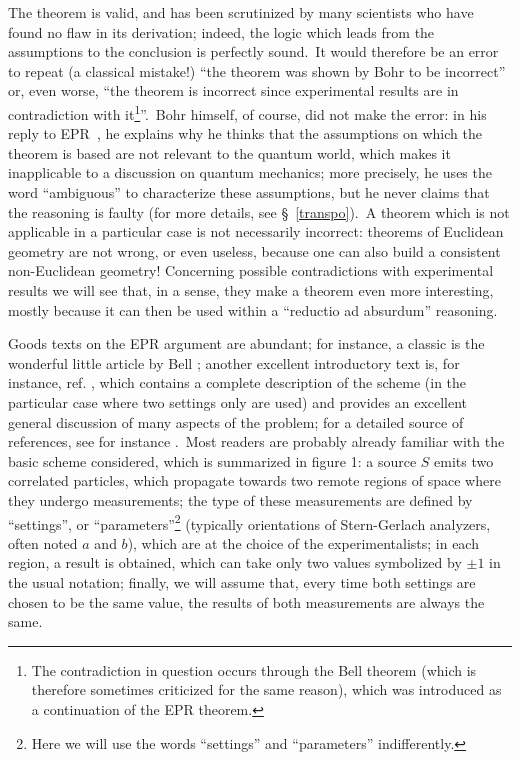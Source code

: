 \documentclass[12pt,onecolumn]{article}%
\begin{document}
The theorem is valid, and has been scrutinized by many scientists who have
found no flaw in its derivation; indeed, the logic which leads from the
assumptions to the conclusion is perfectly sound.\ It would therefore be an
error to repeat (a classical mistake!) ``the theorem was shown by Bohr to be
incorrect'' or, even worse, ``the theorem is incorrect since experimental
results are in contradiction with it\footnote{The contradiction in question
occurs through the Bell theorem (which is therefore sometimes criticized for
the same reason), which was introduced as a continuation of the EPR
theorem.}''.\ Bohr himself, of course, did not make the error: in his reply to
EPR\ \cite{Bohr-EPR}, he explains why he thinks that the assumptions on which
the theorem is based are not relevant to the quantum world, which makes it
inapplicable to a discussion on quantum mechanics; more precisely, he uses the
word ``ambiguous'' to characterize these assumptions, but he never claims that
the reasoning is faulty (for more details, see \S \ \ref{transpo}).\ A theorem
which is not applicable in a particular case is not necessarily incorrect:
theorems of Euclidean geometry are not wrong, or even useless, because one can
also build a consistent non-Euclidean geometry! Concerning possible
contradictions with experimental results we will see that, in a sense, they
make a theorem even more interesting, mostly because it can then be used
within a ``reductio ad absurdum'' reasoning.

Goods texts on the EPR argument are abundant; for instance, a classic is the
wonderful little article by Bell \cite{Bertlmann}; another excellent
introductory text is, for instance, ref. \cite{Mermin-moon}, which contains a
complete description of the scheme (in the particular case where two settings
only are used) and provides an excellent general discussion of many aspects of
the problem; for a detailed source of references, see for instance
\cite{Home-Selleri}.\ Most readers are probably already familiar with the
basic scheme considered, which is summarized in figure 1: a source $S$ emits
two correlated particles, which propagate towards two remote regions of space
where they undergo measurements; the type of these measurements are defined by
``settings'', or ``parameters''\footnote{Here we will use the words
``settings'' and ``parameters'' indifferently.} (typically orientations of
Stern-Gerlach analyzers, often noted $a$ and $b$), which are at the choice of
the experimentalists; in each region, a result is obtained, which can take
only two values symbolized by $\pm1$ in the usual notation; finally, we will
assume that, every time both settings are chosen to be the same value, the
results of both measurements are always the same.
\end{document}
